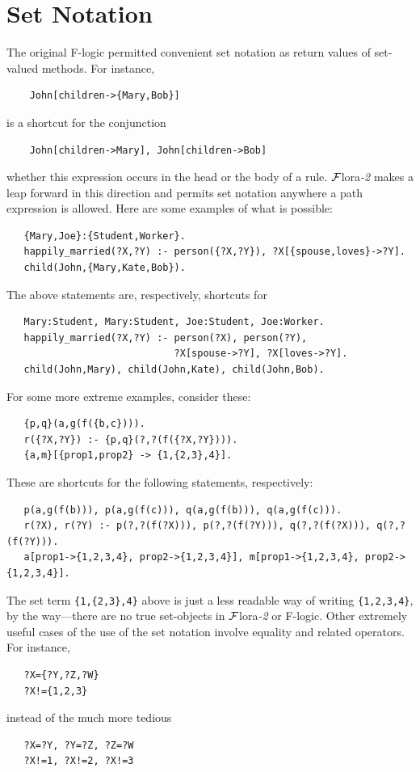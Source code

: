 \documentclass[11pt]{article}
\newcommand{\FLORA}{{\mbox{\sc ${\cal F}${lora}\rm\emph{-2}}}\xspace}
\newcommand{\FLSYSTEM}{\FLORA}
\begin{document}
\section{Set Notation} \label{sec-sets}

The original F-logic \cite{KLW95} permitted convenient set notation as
return values of set-valued methods. For instance,
\begin{verbatim}
    John[children->{Mary,Bob}]
\end{verbatim}
is a shortcut for the conjunction
\begin{verbatim}
    John[children->Mary], John[children->Bob]
\end{verbatim}
whether this expression occurs in the head or the body of a rule. \FLSYSTEM
makes a leap forward in this direction and permits set notation anywhere a
path expression is allowed. Here are some examples of what is possible:
\begin{verbatim}
   {Mary,Joe}:{Student,Worker}.
   happily_married(?X,?Y) :- person({?X,?Y}), ?X[{spouse,loves}->?Y].
   child(John,{Mary,Kate,Bob}).
\end{verbatim}
The above statements are, respectively, shortcuts for 
\begin{verbatim}
   Mary:Student, Mary:Student, Joe:Student, Joe:Worker.
   happily_married(?X,?Y) :- person(?X), person(?Y),
                             ?X[spouse->?Y], ?X[loves->?Y].
   child(John,Mary), child(John,Kate), child(John,Bob).
\end{verbatim}
For some more extreme examples, consider these:
\begin{verbatim}
   {p,q}(a,g(f({b,c}))).
   r({?X,?Y}) :- {p,q}(?,?(f({?X,?Y}))).
   {a,m}[{prop1,prop2} -> {1,{2,3},4}].
\end{verbatim}
These are shortcuts for the following statements, respectively:
\begin{verbatim}
   p(a,g(f(b))), p(a,g(f(c))), q(a,g(f(b))), q(a,g(f(c))).
   r(?X), r(?Y) :- p(?,?(f(?X))), p(?,?(f(?Y))), q(?,?(f(?X))), q(?,?(f(?Y))).
   a[prop1->{1,2,3,4}, prop2->{1,2,3,4}], m[prop1->{1,2,3,4}, prop2->{1,2,3,4}].
\end{verbatim}
The set term \texttt{\{1,\{2,3\},4\}} above is just a less readable way of
writing \texttt{\{1,2,3,4\}}, by the way---there are no true set-objects in
\FLSYSTEM or F-logic.
Other extremely useful cases of the use of the set notation involve equality and related
operators. For instance,
\begin{verbatim}
   ?X={?Y,?Z,?W}
   ?X!={1,2,3}
\end{verbatim}
instead of the much more tedious
\begin{verbatim}
   ?X=?Y, ?Y=?Z, ?Z=?W
   ?X!=1, ?X!=2, ?X!=3
\end{verbatim}
\end{document}
